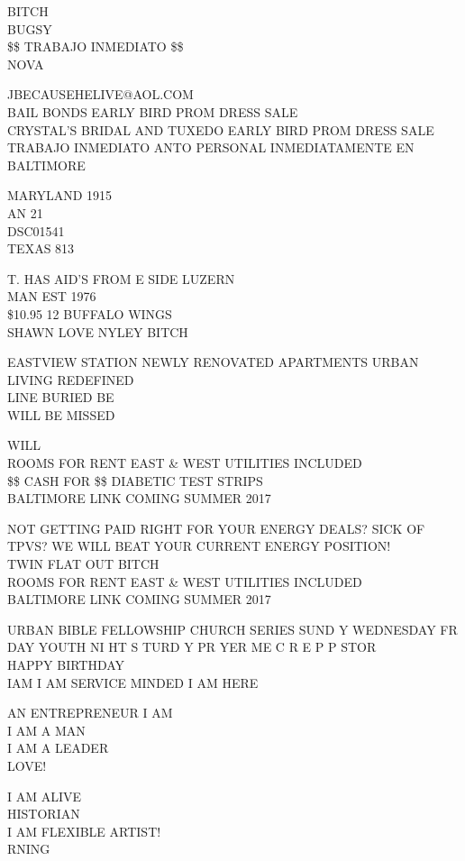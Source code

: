 \documentclass[10pt,letterpaper]{article}
\begin{document}
BITCH\\
BUGSY\\
\$\$ TRABAJO INMEDIATO \$\$\\
NOVA

JBECAUSEHELIVE@AOL.COM\\
BAIL BONDS EARLY BIRD PROM DRESS SALE\\
CRYSTAL'S BRIDAL AND TUXEDO EARLY BIRD PROM DRESS SALE\\
TRABAJO INMEDIATO ANTO PERSONAL INMEDIATAMENTE EN BALTIMORE

MARYLAND 1915\\
AN 21\\
DSC01541\\
TEXAS 813

T. HAS AID'S FROM E SIDE LUZERN\\
MAN EST 1976\\
\$10.95 12 BUFFALO WINGS\\
SHAWN LOVE NYLEY BITCH

EASTVIEW STATION NEWLY RENOVATED APARTMENTS URBAN LIVING REDEFINED\\
LINE BURIED BE\\
WILL BE MISSED

WILL\\
ROOMS FOR RENT EAST \& WEST UTILITIES INCLUDED\\
\$\$ CASH FOR \$\$ DIABETIC TEST STRIPS\\
BALTIMORE LINK COMING SUMMER 2017

NOT GETTING PAID RIGHT FOR YOUR ENERGY DEALS?  SICK OF TPVS?  WE WILL BEAT YOUR CURRENT ENERGY POSITION!\\
TWIN FLAT OUT BITCH\\
ROOMS FOR RENT EAST \& WEST UTILITIES INCLUDED\\
BALTIMORE LINK COMING SUMMER 2017

URBAN BIBLE FELLOWSHIP CHURCH SERIES SUND Y WEDNESDAY FR DAY YOUTH NI HT S TURD Y PR YER ME C R E P P STOR\\
HAPPY BIRTHDAY\\
IAM I AM SERVICE MINDED I AM HERE

AN ENTREPRENEUR I AM\\
I AM A MAN\\
I AM A LEADER\\
LOVE!

I AM ALIVE\\
HISTORIAN\\
I AM FLEXIBLE ARTIST!\\
RNING
\end{document}
